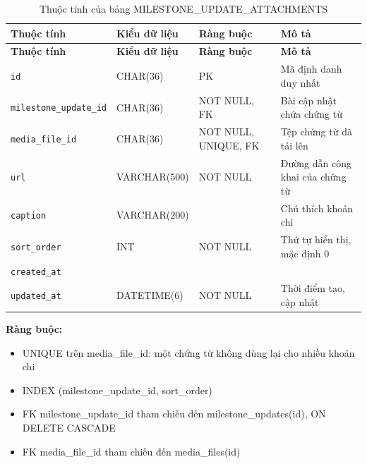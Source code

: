 {\small
\begin{longtable}{|P{3.2cm}|P{2.8cm}|P{2.2cm}|p{5.4cm}|}
    \caption{Thuộc tính của bảng MILESTONE\_\allowbreak{}UPDATE\_\allowbreak{}ATTACHMENTS}
    \label{tab:milestone_update_attachments} \\
    \hline
    \textbf{Thuộc tính} & \textbf{Kiểu dữ liệu} & \textbf{Ràng buộc} & \textbf{Mô tả} \\
    \hline
    \endfirsthead
    \hline
    \textbf{Thuộc tính} & \textbf{Kiểu dữ liệu} & \textbf{Ràng buộc} & \textbf{Mô tả} \\
    \hline
    \endhead

    \texttt{id} & CHAR(36) & PK & Mã định danh duy nhất \\
    \hline
    \texttt{milestone\_\allowbreak{}update\_\allowbreak{}id} & CHAR(36) & NOT NULL, FK & Bài cập nhật chứa chứng từ \\
    \hline
    \texttt{media\_\allowbreak{}file\_\allowbreak{}id} & CHAR(36) & NOT NULL, UNIQUE, FK & Tệp chứng từ đã tải lên \\
    \hline
    \texttt{url} & VARCHAR(500) & NOT NULL & Đường dẫn công khai của chứng từ \\
    \hline
    \texttt{caption} & VARCHAR(200) &  & Chú thích khoản chi \\
    \hline
    \texttt{sort\_\allowbreak{}order} & INT & NOT NULL & Thứ tự hiển thị, mặc định 0 \\
    \hline
    \texttt{created\_\allowbreak{}at} &  &  &  \\
    \hline
    \texttt{updated\_\allowbreak{}at} & DATETIME(6) & NOT NULL & Thời điểm tạo, cập nhật \\
    \hline
\end{longtable}
}

\textbf{Ràng buộc:}
\begin{itemize}
    \item UNIQUE trên media\_\allowbreak{}file\_\allowbreak{}id: một chứng từ không dùng lại cho nhiều khoản chi
    \item INDEX (milestone\_\allowbreak{}update\_\allowbreak{}id, sort\_\allowbreak{}order)
    \item FK milestone\_\allowbreak{}update\_\allowbreak{}id tham chiếu đến milestone\_\allowbreak{}updates(id), ON DELETE CASCADE
    \item FK media\_\allowbreak{}file\_\allowbreak{}id tham chiếu đến media\_\allowbreak{}files(id)
\end{itemize}

